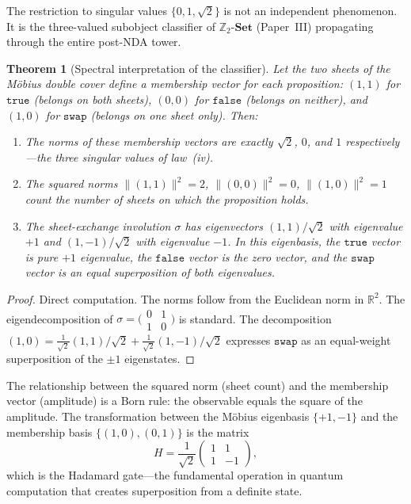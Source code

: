 \documentclass[12pt,a4paper]{article}
\newtheorem{theorem}{Theorem}[section]
\theoremstyle{definition}
\theoremstyle{remark}
\newcommand{\Z}{\mathbb{Z}}
\newcommand{\R}{\mathbb{R}}
\newcommand{\ZSet}{\Z_2\text{-}\mathbf{Set}}
\newcommand{\swap}{\mathtt{swap}}
\begin{document}
The restriction to singular values $\{0, 1, \sqrt{2}\}$ is not
an independent phenomenon. It is the three-valued subobject
classifier of $\ZSet$ (Paper~III) propagating through the entire
post-NDA tower.

\begin{theorem}[Spectral interpretation of the classifier]
\label{thm:spectral-classifier}
Let the two sheets of the M\"{o}bius double cover define a
membership vector for each proposition: $(1, 1)$ for
$\mathtt{true}$ (belongs on both sheets), $(0, 0)$ for
$\mathtt{false}$ (belongs on neither), and $(1, 0)$ for $\swap$
(belongs on one sheet only). Then:
\begin{enumerate}[label=(\alph*), nosep]
  \item The norms of these membership vectors are exactly
  $\sqrt{2}$, $0$, and $1$ respectively---the three singular
  values of law~(iv).
  \item The squared norms $\|(1,1)\|^2 = 2$, $\|(0,0)\|^2 = 0$,
  $\|(1,0)\|^2 = 1$ count the number of sheets on which the
  proposition holds.
  \item The sheet-exchange involution $\sigma$ has eigenvectors
  $(1, 1)/\sqrt{2}$ with eigenvalue $+1$ and $(1, -1)/\sqrt{2}$
  with eigenvalue $-1$. In this eigenbasis, the $\mathtt{true}$
  vector is pure $+1$ eigenvalue, the $\mathtt{false}$ vector is
  the zero vector, and the $\swap$ vector is an equal
  superposition of both eigenvalues.
\end{enumerate}
\end{theorem}

\begin{proof}
Direct computation. The norms follow from the Euclidean norm in
$\R^2$. The eigendecomposition of $\sigma = \bigl(\begin{smallmatrix}
0 & 1 \\ 1 & 0 \end{smallmatrix}\bigr)$ is standard. The
decomposition $(1, 0) = \tfrac{1}{\sqrt{2}}(1, 1)/\sqrt{2} +
\tfrac{1}{\sqrt{2}}(1, -1)/\sqrt{2}$ expresses $\swap$ as an
equal-weight superposition of the $\pm 1$ eigenstates.
\end{proof}

The relationship between the squared norm (sheet count) and the
membership vector (amplitude) is a Born rule: the observable
equals the square of the amplitude. The transformation between
the M\"{o}bius eigenbasis $\{+1, -1\}$ and the membership basis
$\{(1,0), (0,1)\}$ is the matrix
\[
  H = \frac{1}{\sqrt{2}}
  \begin{pmatrix} 1 & 1 \\ 1 & -1 \end{pmatrix},
\]
which is the Hadamard gate---the fundamental operation in quantum
computation that creates superposition from a definite state.
\end{document}
